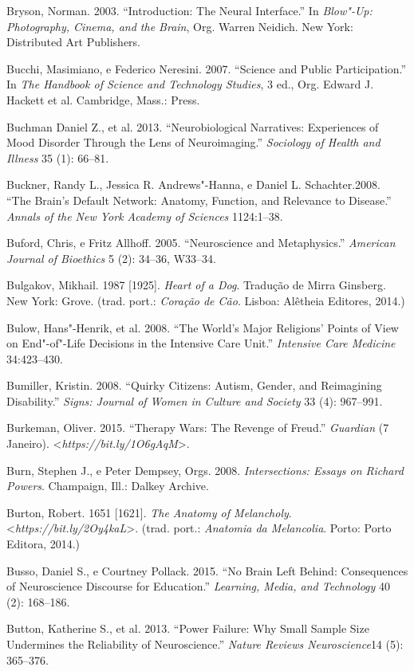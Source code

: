 {\begin{Parskip}
Bryson, Norman. 2003. ``Introduction: The Neural Interface.'' In
\emph{Blow"-Up: Photography, Cinema, and the Brain}, Org. Warren Neidich.
New York: Distributed Art Publishers.

Bucchi, Masimiano, e Federico Neresini. 2007. ``Science and Public
Participation.'' In \emph{The Handbook of Science and Technology
Studies}, 3 ed., Org. Edward J. Hackett et al. Cambridge, Mass.: 
Press.

Buchman Daniel Z., et al. 2013. ``Neurobiological Narratives:
Experiences of Mood Disorder Through the Lens of Neuroimaging.''
\emph{Sociology of Health and Illness} 35 (1): 66--81.

Buckner, Randy L., Jessica R. Andrews"-Hanna, e Daniel L. Schachter.2008.
``The Brain's Default Network: Anatomy, Function, and Relevance to
Disease.'' \emph{Annals of the New York Academy of Sciences} 1124:1--38.

Buford, Chris, e Fritz Allhoff. 2005. ``Neuroscience and Metaphysics.''
\emph{American Journal of Bioethics} 5 (2): 34--36, W33--34.

Bulgakov, Mikhail. 1987 {[}1925{]}. \emph{Heart of a Dog}. Tradução de
Mirra Ginsberg. New York: Grove. (trad. port.: \emph{Coração de Cão}.
Lisboa: Alêtheia Editores, 2014.)

Bulow, Hans"-Henrik, et al. 2008. ``The World's Major Religions' Points
of View on End"-of"-Life Decisions in the Intensive Care Unit.''
\emph{Intensive Care Medicine} 34:423--430.

Bumiller, Kristin. 2008. ``Quirky Citizens: Autism, Gender, and
Reimagining Disability.'' \emph{Signs: Journal of Women in Culture and
Society} 33 (4): 967--991.

Burkeman, Oliver. 2015. ``Therapy Wars: The Revenge of Freud.''
\emph{Guardian} (7 Janeiro).
\textless{}\emph{https://bit.ly/1O6gAqM}\textgreater{}.

Burn, Stephen J., e Peter Dempsey, Orgs. 2008. \emph{Intersections:
Essays on Richard Powers}. Champaign, Ill.: Dalkey Archive.

Burton, Robert. 1651 {[}1621{]}. \emph{The Anatomy of Melancholy}.
\textless{}\emph{https://bit.ly/2Oy4kaL}\textgreater{}. (trad.
port.: \emph{Anatomia da Melancolia}. Porto: Porto Editora, 2014.)

Busso, Daniel S., e Courtney Pollack. 2015. ``No Brain Left Behind:
Consequences of Neuroscience Discourse for Education.'' \emph{Learning,
Media, and Technology} 40 (2): 168--186.

Button, Katherine S., et al. 2013. ``Power Failure: Why Small Sample
Size Undermines the Reliability of Neuroscience.'' \emph{Nature Reviews
Neuroscience}14 (5): 365--376.


\end{Parskip}}

